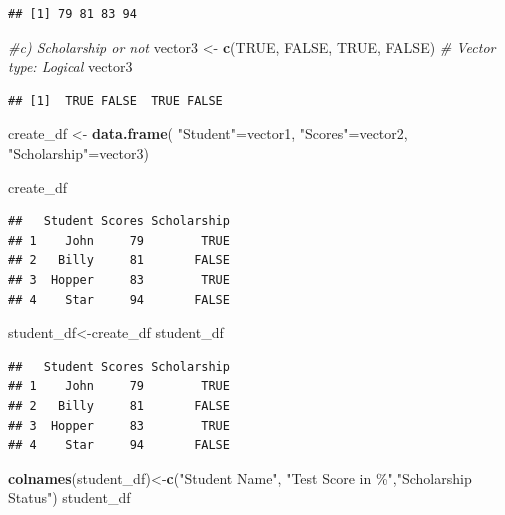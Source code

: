 \documentclass[
]{article}
\newenvironment{Shaded}{\begin{snugshade}}{\end{snugshade}}
\newcommand{\CommentTok}[1]{\textcolor[rgb]{0.56,0.35,0.01}{\textit{#1}}}
\newcommand{\ConstantTok}[1]{\textcolor[rgb]{0.56,0.35,0.01}{#1}}
\newcommand{\FunctionTok}[1]{\textcolor[rgb]{0.13,0.29,0.53}{\textbf{#1}}}
\newcommand{\NormalTok}[1]{#1}
\newcommand{\OtherTok}[1]{\textcolor[rgb]{0.56,0.35,0.01}{#1}}
\newcommand{\StringTok}[1]{\textcolor[rgb]{0.31,0.60,0.02}{#1}}
\begin{document}
\begin{verbatim}
## [1] 79 81 83 94
\end{verbatim}

\begin{Shaded}
\begin{Highlighting}[]
\CommentTok{\#c) Scholarship or not }
\NormalTok{vector3 }\OtherTok{\textless{}{-}} \FunctionTok{c}\NormalTok{(}\ConstantTok{TRUE}\NormalTok{, }\ConstantTok{FALSE}\NormalTok{, }\ConstantTok{TRUE}\NormalTok{, }\ConstantTok{FALSE}\NormalTok{) }\CommentTok{\# Vector type: Logical}
\NormalTok{vector3}
\end{Highlighting}
\end{Shaded}

\begin{verbatim}
## [1]  TRUE FALSE  TRUE FALSE
\end{verbatim}

\begin{Shaded}
\begin{Highlighting}[]
\NormalTok{create\_df }\OtherTok{\textless{}{-}} \FunctionTok{data.frame}\NormalTok{(}
  \StringTok{"Student"}\OtherTok{=}\NormalTok{vector1,}
  \StringTok{"Scores"}\OtherTok{=}\NormalTok{vector2, }
  \StringTok{"Scholarship"}\OtherTok{=}\NormalTok{vector3)}

\NormalTok{create\_df}
\end{Highlighting}
\end{Shaded}

\begin{verbatim}
##   Student Scores Scholarship
## 1    John     79        TRUE
## 2   Billy     81       FALSE
## 3  Hopper     83        TRUE
## 4    Star     94       FALSE
\end{verbatim}

\begin{Shaded}
\begin{Highlighting}[]
\NormalTok{student\_df}\OtherTok{\textless{}{-}}\NormalTok{create\_df}
\NormalTok{student\_df}
\end{Highlighting}
\end{Shaded}

\begin{verbatim}
##   Student Scores Scholarship
## 1    John     79        TRUE
## 2   Billy     81       FALSE
## 3  Hopper     83        TRUE
## 4    Star     94       FALSE
\end{verbatim}

\begin{Shaded}
\begin{Highlighting}[]
\FunctionTok{colnames}\NormalTok{(student\_df)}\OtherTok{\textless{}{-}}\FunctionTok{c}\NormalTok{(}\StringTok{"Student Name"}\NormalTok{, }\StringTok{"Test Score in \%"}\NormalTok{,}\StringTok{"Scholarship Status"}\NormalTok{)}
\NormalTok{student\_df}
\end{Highlighting}
\end{Shaded}
\end{document}
